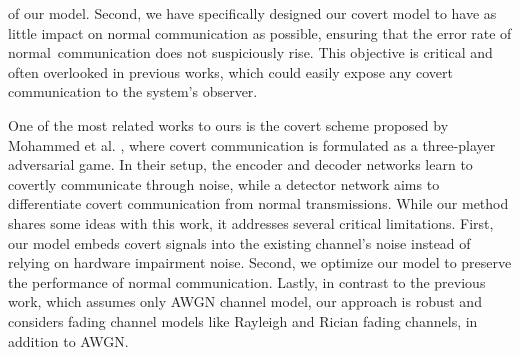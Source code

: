 of our model. Second, we have specifically designed our covert model to have as little impact on normal communication as possible, ensuring that the error rate of normal communication does not suspiciously rise. This objective is critical and often overlooked in previous works, which could easily expose any covert communication to the system's observer.

One of the most related works to ours is the covert scheme proposed by Mohammed et al. \cite{mohammed2021adversarial}, where covert communication is formulated as a three-player adversarial game. In their setup, the encoder and decoder networks learn to covertly communicate through noise, while a detector network aims to differentiate covert communication from normal transmissions. While our method shares some ideas with this work, it addresses several critical limitations. First, our model embeds covert signals into the existing channel's noise instead of relying on hardware impairment noise. Second, we optimize our model to preserve the performance of normal communication. Lastly, in contrast to the previous work, which assumes only AWGN channel model, our approach is robust and considers fading channel models like Rayleigh and Rician fading channels, in addition to AWGN.
